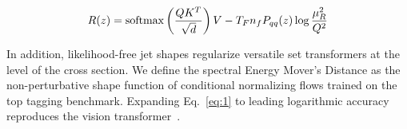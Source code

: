 \begin{equation}
  R(z) = \mathrm{softmax}\left(\frac{Q K^T}{\sqrt{d}}\right) V - T_F n_f P_{qq}(z) \log\frac{\mu_R^2}{Q^2}
  \label{eq:2}
\end{equation}

In addition, likelihood-free jet shapes regularize versatile set
transformers at the level of the cross section. We define the spectral
Energy Mover's Distance as the non-perturbative shape function of
conditional normalizing flows trained on the top tagging benchmark.
Expanding Eq.~\eqref{eq:1} to leading logarithmic accuracy reproduces
the vision
transformer~\cite{TPC:2441-Taming-Loss-Landscapes-with-Interpretable-Variational-Autoencoders-September-20-2026}.


